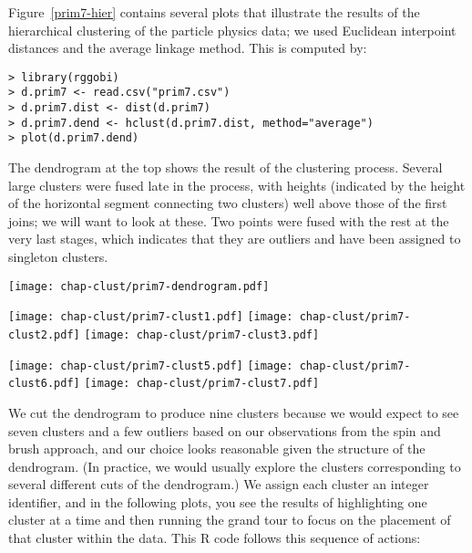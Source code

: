 
Figure~\ref{prim7-hier} contains several plots that illustrate the
results of the hierarchical clustering of the particle physics data;
we used Euclidean interpoint distances and the average linkage
method. This is computed by:

\begin{verbatim}
> library(rggobi)
> d.prim7 <- read.csv("prim7.csv")
> d.prim7.dist <- dist(d.prim7)
> d.prim7.dend <- hclust(d.prim7.dist, method="average")
> plot(d.prim7.dend)
\end{verbatim}


\noindent The dendrogram at the top shows the result of the clustering process.
Several large clusters were fused late in the process, with heights
(indicated by the height of the horizontal segment connecting two
clusters) well above those of the first joins; we will want to look at
these.  Two points were fused with the rest at the very last stages,
which indicates that they are outliers and have been assigned to
singleton clusters.

\begin{figure*}[htbp]
\centerline{{\texttt{[image: chap-clust/prim7-dendrogram.pdf]}}}
\smallskip
\centerline{{\texttt{[image: chap-clust/prim7-clust1.pdf]}}
 {\texttt{[image: chap-clust/prim7-clust2.pdf]}}
 {\texttt{[image: chap-clust/prim7-clust3.pdf]}}}
\smallskip
\centerline{{\texttt{[image: chap-clust/prim7-clust5.pdf]}}
 {\texttt{[image: chap-clust/prim7-clust6.pdf]}}
 {\texttt{[image: chap-clust/prim7-clust7.pdf]}}}
\caption[Hierarchical clustering of the particle physics
data]{Hierarchical clustering of the particle physics data.  The
dendrogram shows the results of clustering the data using average
linkage.  Clusters 1, 2, and 3 carve up the base triangle of the data;
clusters 5 and 6 divide one of the arms; and cluster 7 is a singleton.
}
\label{prim7-hier}
\end{figure*}

We cut the dendrogram to produce nine clusters because we would expect
to see seven clusters and a few outliers based on our observations
from the spin and brush approach, and our choice looks reasonable
given the structure of the dendrogram.  (In practice, we would usually
explore the clusters corresponding to several different cuts of the
dendrogram.) We assign each cluster an integer identifier, and in the
following plots, you see the results of highlighting one cluster at a
time and then running the grand tour to focus on the placement of that
cluster within the data. This R code follows this sequence of actions:

